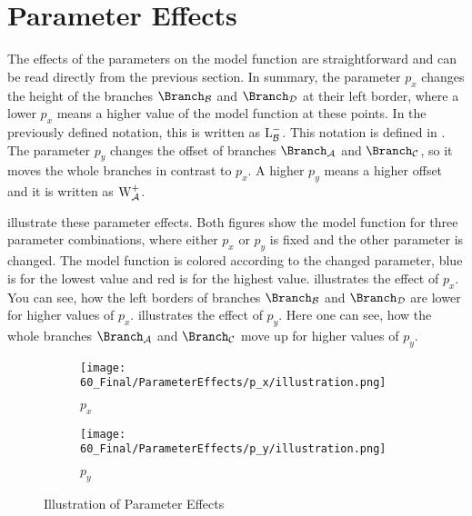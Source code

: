 \section{Parameter Effects}

The effects of the parameters on the model function are straightforward and can be read directly from the previous section.
In summary, the parameter $p_x$ changes the height of the branches $\Branch_\B$ and $\Branch_\D$ at their left border, where a lower $p_x$ means a higher value of the model function at these points.
In the previously defined notation, this is written as $\operatorname{L}_{\mathcal{B}}^-$.
This notation is defined in .
The parameter $p_y$ changes the offset of branches $\Branch_\A$ and $\Branch_\C$, so it moves the whole branches in contrast to $p_x$.
A higher $p_y$ means a higher offset and it is written as $\operatorname{W}_{\mathcal{A}}^+$.


 illustrate these parameter effects.
Both figures show the model function for three parameter combinations, where either $p_x$ or $p_y$ is fixed and the other parameter is changed.
The model function is colored according to the changed parameter, blue is for the lowest value and red is for the highest value.
 illustrates the effect of $p_x$.
You can see, how the left borders of branches $\Branch_\B$ and $\Branch_\D$ are lower for higher values of $p_x$.
 illustrates the effect of $p_y$.
Here one can see, how the whole branches $\Branch_\A$ and $\Branch_\C$ move up for higher values of $p_y$.

\begin{figure}
    \centering
    \begin{subfigure}{0.4\textwidth}
        \centering
        \texttt{[image: 60\_Final/ParameterEffects/p\_x/illustration.png]}
        \caption{$p_x$}
        \label{fig:final.param.effects.px}
    \end{subfigure}
    \begin{subfigure}{0.4\textwidth}
        \centering
        \texttt{[image: 60\_Final/ParameterEffects/p\_y/illustration.png]}
        \caption{$p_y$}
        \label{fig:final.param.effects.py}
    \end{subfigure}
    \caption{Illustration of Parameter Effects}
\end{figure}

